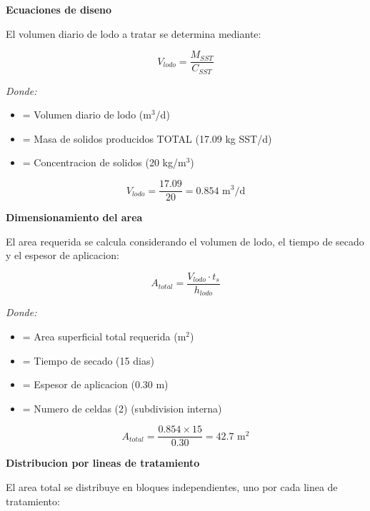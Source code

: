 \documentclass[12pt,a4paper]{article}
\newcommand{\captionequation}[1]{}  %
\begin{document}
\textbf{Ecuaciones de diseno}

El volumen diario de lodo a tratar se determina mediante:

\begin{equation}
V_{lodo} = \frac{M_{SST}}{C_{SST}}
\end{equation}
\captionequation{Volumen diario de lodo a tratar}

\textit{Donde:}
\begin{itemize}[noitemsep,leftmargin=2em]
    \item[$V_{lodo}$] = Volumen diario de lodo (m$^3$/d)
    \item[$M_{SST}$] = Masa de solidos producidos TOTAL (17.09 kg SST/d)
    \item[$C_{SST}$] = Concentracion de solidos (20 kg/m$^3$)
\end{itemize}

\begin{equation}
V_{lodo} = \frac{17.09}{20} = 0.854 \text{ m}^3\text{/d}
\end{equation}

\textbf{Dimensionamiento del area}

El area requerida se calcula considerando el volumen de lodo, el tiempo de secado y el espesor de aplicacion:

\begin{equation}
A_{total} = \frac{V_{lodo} \cdot t_s}{h_{lodo}}
\end{equation}
\captionequation{Area superficial total del lecho de secado}

\textit{Donde:}
\begin{itemize}[noitemsep,leftmargin=2em]
    \item[$A_{total}$] = Area superficial total requerida (m$^2$)
    \item[$t_s$] = Tiempo de secado (15 dias)
    \item[$h_{lodo}$] = Espesor de aplicacion (0.30 m)
    \item[$n_{celdas}$] = Numero de celdas (2) (subdivision interna)
\end{itemize}

\begin{equation}
A_{total} = \frac{0.854 \times 15}{0.30} = 42.7 \text{ m}^2
\end{equation}

\textbf{Distribucion por lineas de tratamiento}

El area total se distribuye en bloques independientes, uno por cada linea de tratamiento:
\end{document}
